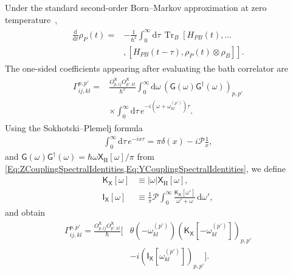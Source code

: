 \documentclass[prx,aps,twocolumn,article]{revtex4-2}
\newcommand{\msf}[1]{\mathsf{#1}}
\newcommand{\msIX}{\msf{I}_\msf{X}}
\newcommand{\msG}{\msf{G}}
\newcommand{\msKX}{\msf{K}_\msf{X}}
\newcommand{\msXH}{\msX_\mathrm{H}}
\newcommand{\msX}{\msf{X}}
\begin{document}
Under the standard second-order Born--Markov approximation at zero
temperature~\cite{BreuerPetruccione:2002},
\begin{align}
\begin{aligned}
    \frac{\mathrm d}{\mathrm dt}\rho_P(t)
    ={}&
    -\frac{1}{\hbar^2}
    \int_0^\infty\!\mathrm d\tau\,
    \operatorname{Tr}_B
    \left[
        H_{PB}(t),\dots\right.\\
        &\left.,
        \left[
            H_{PB}(t-\tau),
            \rho_P(t)\otimes\rho_B
        \right]
    \right].
\end{aligned}
\label{Eq:BornMarkovME}
\end{align}
The one-sided coefficients appearing after evaluating the bath correlator
are
\begin{align}
\begin{aligned}
    \Gamma_{ij,kl}^{p,p'}
    ={}&
    \frac{
        O_{p,ij}^{\msX}
        O_{p',kl}^{\msX}
    }{\hbar^2}
    \int_0^\infty\!\mathrm d\omega\,
    \left(
        \msG(\omega)\msG^\dagger(\omega)
    \right)_{p,p'}
    \\
    &\times
    \int_0^\infty\!\mathrm d\tau\,
    e^{-i(\omega+\omega_{kl}^{(p')})\tau}.
\end{aligned}
\label{Eq:AECoefs}
\end{align}
Using the Sokhotski--Plemelj formula
\begin{align}
    \int_0^\infty\!\mathrm d\tau\,
    e^{-ix\tau}
    =
    \pi\delta(x)
    -
    i\mathcal P\frac{1}{x},
\end{align}
and
$\msG(\omega)\msG^\dagger(\omega)
=\hbar\omega\msXH[\omega]/\pi$
from
\cref{Eq:ZCouplingSpectralIdentities,Eq:YCouplingSpectralIdentities},
we define
\begin{align}
    \msKX[\omega]
    &\equiv
    |\omega|\msXH[\omega],
    \\
    \msIX[\omega]
    &\equiv
    \frac{1}{\pi}
    \mathcal P\!\int_0^\infty
    \frac{
        \msKX[\omega']
    }{
        \omega'+\omega
    }
    \,\mathrm d\omega',
\end{align}
and obtain
\begin{align}
\begin{aligned}
    \Gamma_{ij,kl}^{p,p'}
    =
    \frac{
        O_{p,ij}^{\msX}
        O_{p',kl}^{\msX}
    }{\hbar}
    \Big[
        &\theta(-\omega_{kl}^{(p')})
        \left(
            \msKX[-\omega_{kl}^{(p')}]
        \right)_{p,p'}
        \\
        &-
        i
        \left(
            \msIX[\omega_{kl}^{(p')}]
        \right)_{p,p'}
    \Big].
\end{aligned}
\label{Eq:AEGammaCompact}
\end{align}
\end{document}
